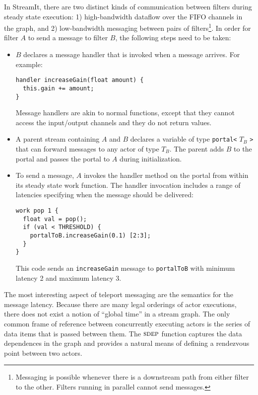 In StreamIt, there are two distinct kinds of communication between
filters during steady state execution: 1) high-bandwidth dataflow over
the FIFO channels in the graph, and 2) low-bandwidth messaging between
pairs of filters\footnote{\small Messaging is possible whenever there
is a downstream path from either filter to the other.  Filters running
in parallel cannot send messages.}.  In order for filter $A$ to send a
message to filter $B$, the following steps need to be taken:
\begin{itemize}

\item $B$ declares a message handler that is invoked when a
message arrives.  For example:
{\small
\begin{verbatim}
handler increaseGain(float amount) {
  this.gain += amount;
}
\end{verbatim}
}
Message handlers are akin to normal functions, except that they
cannot access the input/output channels and they do not return values.

\item A parent stream containing $A$ and $B$ declares a variable
of type {\tt portal<} $T_B$ {\tt >} that can forward messages to
any actor of type $T_B$.  The parent adds $B$ to the portal and passes
the portal to $A$ during initialization.

\item To send a message, $A$ invokes the handler method on the portal
from within its steady state work function. The handler invocation
includes a range of latencies specifying when the message should be
delivered: {\small
\begin{verbatim}
work pop 1 {
  float val = pop();
  if (val < THRESHOLD) {
    portalToB.increaseGain(0.1) [2:3];
  }
}
\end{verbatim}}
This code sends an {\tt increaseGain} message to {\tt portalToB} with
minimum latency 2 and maximum latency 3.

\end{itemize}
The most interesting aspect of teleport messaging are the semantics
for the message latency.  Because there are many legal orderings of
actor executions, there does not exist a notion of ``global time'' in
a stream graph.  The only common frame of reference between
concurrently executing actors is the series of data items that is
passed between them.  The $\textsc{sdep}$ function captures the data
dependences in the graph and provides a natural means of defining a
rendezvous point between two actors.

